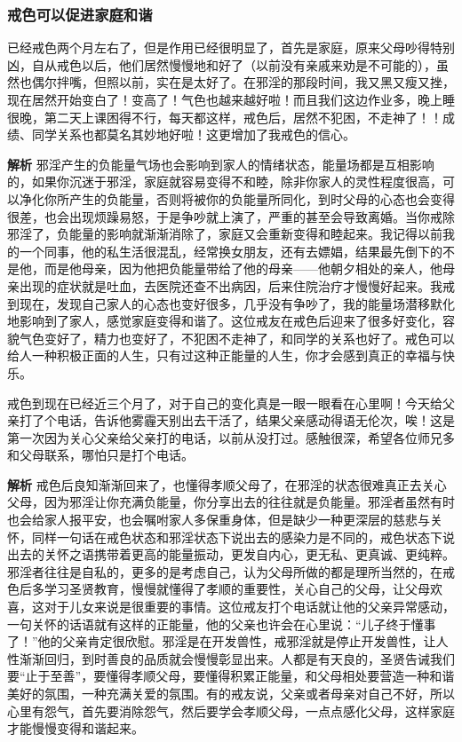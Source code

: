\subsubsection{戒色可以促进家庭和谐}

\begin{case}
    已经戒色两个月左右了，但是作用已经很明显了，首先是家庭，原来父母吵得特别凶，自从戒色以后，他们居然慢慢地和好了（以前没有亲戚来劝是不可能的），虽然也偶尔拌嘴，但照以前，实在是太好了。在邪淫的那段时间，我又黑又瘦又挫，现在居然开始变白了！变高了！气色也越来越好啦！而且我们这边作业多，晚上睡很晚，第二天上课困得不行，每天都这样，戒色后，居然不犯困，不走神了！！成绩、同学关系也都莫名其妙地好啦！这更增加了我戒色的信心。

    \textbf{解析} 邪淫产生的负能量气场也会影响到家人的情绪状态，能量场都是互相影响的，如果你沉迷于邪淫，家庭就容易变得不和睦，除非你家人的灵性程度很高，可以净化你所产生的负能量，否则将被你的负能量所同化，到时父母的心态也会变得很差，也会出现烦躁易怒，于是争吵就上演了，严重的甚至会导致离婚。当你戒除邪淫了，负能量的影响就渐渐消除了，家庭又会重新变得和睦起来。我记得以前我的一个同事，他的私生活很混乱，经常换女朋友，还有去嫖娼，结果最先倒下的不是他，而是他母亲，因为他把负能量带给了他的母亲——他朝夕相处的亲人，他母亲出现的症状就是吐血，去医院还查不出病因，后来住院治疗才慢慢好起来。我戒到现在，发现自己家人的心态也变好很多，几乎没有争吵了，我的能量场潜移默化地影响到了家人，感觉家庭变得和谐了。这位戒友在戒色后迎来了很多好变化，容貌气色变好了，精力也变好了，不犯困不走神了，和同学的关系也好了。戒色可以给人一种积极正面的人生，只有过这种正能量的人生，你才会感到真正的幸福与快乐。
\end{case}

\begin{case}
    戒色到现在已经近三个月了，对于自己的变化真是一眼一眼看在心里啊！今天给父亲打了个电话，告诉他雾霾天别出去干活了，结果父亲感动得语无伦次，唉！这是第一次因为关心父亲给父亲打的电话，以前从没打过。感触很深，希望各位师兄多和父母联系，哪怕只是打个电话。

    \textbf{解析} 戒色后良知渐渐回来了，也懂得孝顺父母了，在邪淫的状态很难真正去关心父母，因为邪淫让你充满负能量，你分享出去的往往就是负能量。邪淫者虽然有时也会给家人报平安，也会嘱咐家人多保重身体，但是缺少一种更深层的慈悲与关怀，同样一句话在戒色状态和邪淫状态下说出去的感染力是不同的，戒色状态下说出去的关怀之语携带着更高的能量振动，更发自内心，更无私、更真诚、更纯粹。邪淫者往往是自私的，更多的是考虑自己，认为父母所做的都是理所当然的，在戒色后多学习圣贤教育，慢慢就懂得了孝顺的重要性，关心自己的父母，让父母欢喜，这对于儿女来说是很重要的事情。这位戒友打个电话就让他的父亲异常感动，一句关怀的话语就有这样的正能量，他的父亲也许会在心里说：“儿子终于懂事了！”他的父亲肯定很欣慰。邪淫是在开发兽性，戒邪淫就是停止开发兽性，让人性渐渐回归，到时善良的品质就会慢慢彰显出来。人都是有天良的，圣贤告诫我们要“止于至善”，要懂得孝顺父母，要懂得积累正能量，和父母相处要营造一种和谐美好的氛围，一种充满关爱的氛围。有的戒友说，父亲或者母亲对自己不好，所以心里有怨气，首先要消除怨气，然后要学会孝顺父母，一点点感化父母，这样家庭才能慢慢变得和谐起来。
\end{case}

